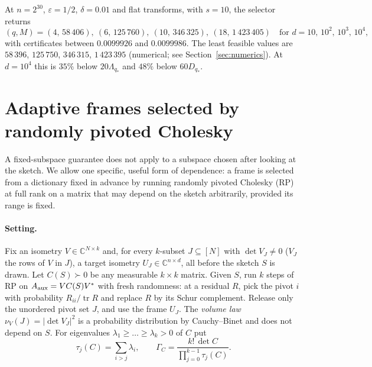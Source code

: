 \documentclass[11pt,a4paper]{article}
\theoremstyle{definition}
\theoremstyle{remark}
\numberwithin{equation}{section}
\newcommand{\C}{\mathbb C}
\newcommand{\tr}{\operatorname{tr}}
\newcommand{\eps}{\varepsilon}
\begin{document}
At $n=2^{30}$, $\eps=1/2$, $\delta=0.01$ and flat transforms, with $s=10$, the
selector returns
\[
 (q,M)=(4,\,58\,406),\ (6,\,125\,760),\ (10,\,346\,325),\ (18,\,1\,423\,405)
 \quad\text{for } d=10,\,10^2,\,10^3,\,10^4,
\]
with certificates between $0.0099926$ and $0.0099986$. The least feasible
values are $58\,396$, $125\,750$, $346\,315$, $1\,423\,395$ (numerical; see
Section~\ref{sec:numerics}). At $d=10^4$ this is $35\%$ below
$20\Lambda_{q_*}$ and $48\%$ below $60D_{q_*}$.

\section{Adaptive frames selected by randomly pivoted Cholesky}\label{sec:gate}

A fixed-subspace guarantee does not apply to a subspace chosen after looking at
the sketch. We allow one specific, useful form of dependence: a frame is
selected from a dictionary fixed in advance by running randomly pivoted
Cholesky (RP)~\cite{CETW} at full rank on a matrix that may depend on the
sketch arbitrarily, provided its range is fixed.

\paragraph{Setting.} Fix an isometry $V\in\C^{N\times k}$ and, for every
$k$-subset $J\subseteq[N]$ with $\det V_J\neq0$ ($V_J$ the rows of $V$ in $J$),
a target isometry $U_J\in\C^{n\times d}$, all before the sketch $S$ is drawn.
Let $C(S)\succ0$ be any measurable $k\times k$ matrix. Given $S$, run $k$ steps
of RP on $A_{\rm aux}=VC(S)V^*$ with fresh randomness: at a residual $R$, pick
the pivot $i$ with probability $R_{ii}/\tr R$ and replace $R$ by its Schur
complement. Release only the unordered pivot set $J$, and use the frame $U_J$.
The \emph{volume law} $\nu_V(J)=|\det V_J|^2$ is a probability distribution by
Cauchy--Binet and does not depend on $S$. For eigenvalues
$\lambda_1\ge\dots\ge\lambda_k>0$ of $C$ put
\begin{equation}\label{eq:gateprice}
 \tau_j(C)=\sum_{i>j}\lambda_i,\qquad
 \Gamma_C=\frac{k!\,\det C}{\prod_{j=0}^{k-1}\tau_j(C)} .
\end{equation}
\end{document}
